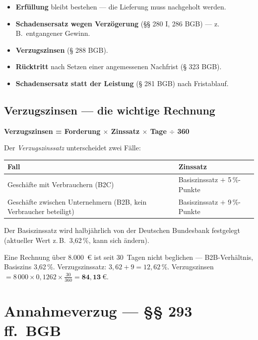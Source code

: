 \documentclass[11pt, a4paper]{article}
\begin{document}
\begin{itemize}[itemsep=2pt]
  \item \textbf{Erfüllung} bleibt bestehen --- die Lieferung muss nachgeholt werden.
  \item \textbf{Schadensersatz wegen Verzögerung} (§§ 280 I, 286 BGB) --- z.\,B.\ entgangener Gewinn.
  \item \textbf{Verzugszinsen} (§ 288 BGB).
  \item \textbf{Rücktritt} nach Setzen einer angemessenen Nachfrist (§ 323 BGB).
  \item \textbf{Schadensersatz statt der Leistung} (§ 281 BGB) nach Fristablauf.
\end{itemize}

\subsection{Verzugszinsen --- die wichtige Rechnung}

\begin{merksatz}[title={Formel}]
\textbf{Verzugszinsen = Forderung $\times$ Zinssatz $\times$ Tage $\div$ 360}
\end{merksatz}

Der \emph{Verzugszinssatz} unterscheidet zwei Fälle:

\begin{center}
\begin{tabular}{p{6cm} p{8cm}}
\toprule
\textbf{Fall} & \textbf{Zinssatz}\\
\midrule
Geschäfte mit Verbrauchern (B2C) & Basiszinssatz $+$ 5\,\%-Punkte\\
Geschäfte zwischen Unternehmern (B2B, kein Verbraucher beteiligt) & Basiszinssatz $+$ 9\,\%-Punkte\\
\bottomrule
\end{tabular}
\end{center}

Der Basiszinssatz wird halbjährlich von der Deutschen Bundesbank festgelegt
(aktueller Wert z.\,B.\ 3{,}62\,\%, kann sich ändern).

\begin{beispiel}
Eine Rechnung über 8.000~€ ist seit 30~Tagen nicht beglichen --- B2B-Verhältnis,
Basiszins 3{,}62\,\%. Verzugszinssatz: $3{,}62 + 9 = 12{,}62\,\%$. Verzugszinsen
$= 8\,000 \times 0{,}1262 \times \frac{30}{360} = \mathbf{84{,}13~€}$.
\end{beispiel}

\section{Annahmeverzug --- §§ 293 ff.\ BGB}
\end{document}

